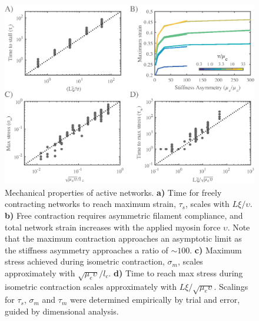 \begin{figure}[H]
	\centering
	\includegraphics[width=\hsize]{active/figures/FigS3}
	\caption{\label{fig:active_supp}  Mechanical properties of active networks.  \textbf{a)}  Time for freely contracting networks to reach maximum strain, $\tau_s$, scales with $L\xi/\upsilon$.  \textbf{b)} Free contraction requires asymmetric filament compliance, and total network strain increases with the applied myosin force $\upsilon$. Note that the maximum contraction approaches an asymptotic limit as the stiffness asymmetry approaches a ratio of $\sim 100$.   \textbf{c)}  Maximum stress achieved during isometric contraction, $\sigma_m$, scales approximately with $\sqrt{\mu_e\upsilon}/l_c$.  \textbf{d)} Time to reach max stress during isometric contraction scales approximately with $L\xi/\sqrt{\mu_e\upsilon}$. Scalings for $\tau_s$, $\sigma_m$ and $\tau_m$ were determined empirically by trial and error, guided by dimensional analysis. }
\end{figure}

